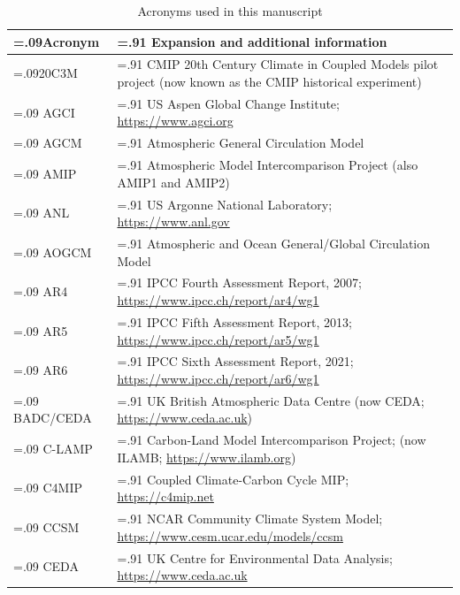 \documentclass[manuscript]{copernicus}
\begin{document}
\begin{table}[htp]
\renewcommand{\arraystretch}{2}
\scriptsize
\centering
\caption{Acronyms used in this manuscript}
\resizebox{\textwidth}{!} {
	\begin{tabularx}{1\textwidth} { 
	  | >{\raggedright\arraybackslash\hsize=.09\hsize}X
	  | >{\centering\arraybackslash\hsize=.91\hsize}X | }
\hline
\textbf{Acronym} & \textbf{Expansion and additional information}\\ \hline
20C3M & CMIP 20th Century Climate in Coupled Models pilot project (now known as the CMIP historical experiment)\\ \hline
AGCI & US Aspen Global Change Institute; \url{https://www.agci.org}\\ \hline
AGCM & Atmospheric General Circulation Model\\ \hline
AMIP & Atmospheric Model Intercomparison Project (also AMIP1 and AMIP2)\\ \hline
ANL & US Argonne National Laboratory; \url{https://www.anl.gov}\\ \hline
AOGCM & Atmospheric and Ocean General/Global Circulation Model\\ \hline
AR4 & IPCC Fourth Assessment Report, 2007; \url{https://www.ipcc.ch/report/ar4/wg1}\\ \hline
AR5 & IPCC Fifth Assessment Report, 2013; \url{https://www.ipcc.ch/report/ar5/wg1}\\ \hline
AR6 & IPCC Sixth Assessment Report, 2021; \url{https://www.ipcc.ch/report/ar6/wg1}\\ \hline
BADC/CEDA & UK British Atmospheric Data Centre (now CEDA; \url{https://www.ceda.ac.uk})\\ \hline
C-LAMP & Carbon-Land Model Intercomparison Project; (now ILAMB; \url{https://www.ilamb.org})\\ \hline
C4MIP & Coupled Climate-Carbon Cycle MIP; \url{https://c4mip.net}\\ \hline
CCSM & NCAR Community Climate System Model; \url{https://www.cesm.ucar.edu/models/ccsm}\\ \hline
CEDA & UK Centre for Environmental Data Analysis; \url{https://www.ceda.ac.uk}\\ \hline

\end{tabularx}}
\end{table}
\end{document}
